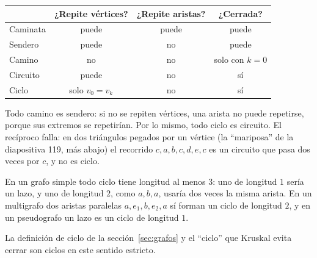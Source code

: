 \documentclass[11pt,letterpaper]{article}
\begin{document}
\begin{center}
\small
\begin{tabular}{lccc}
  \toprule
  & \textbf{¿Repite vértices?} & \textbf{¿Repite aristas?}
    & \textbf{¿Cerrada?} \\
  \midrule
  Caminata & puede & puede & puede \\
  Sendero & puede & no & puede \\
  Camino & no & no & solo con $k = 0$ \\
  Circuito & puede & no & sí \\
  Ciclo & solo $v_0 = v_k$ & no & sí \\
  \bottomrule
\end{tabular}
\end{center}

Todo camino es sendero: si no se repiten vértices, una arista no puede
repetirse, porque sus extremos se repetirían. Por lo mismo, todo ciclo
es circuito. El recíproco falla: en dos triángulos pegados por un
vértice (la ``mariposa'' de la diapositiva 119, más abajo) el
recorrido $c, a, b, c, d, e, c$ es un circuito que pasa dos
veces por $c$, y no es ciclo.

\begin{observacion}
  En un grafo simple todo ciclo tiene longitud al menos $3$: uno de
  longitud $1$ sería un lazo, y uno de longitud $2$, como $a, b, a$,
  usaría dos veces la misma arista. En un multigrafo dos aristas
  paralelas $a, e_1, b, e_2, a$ sí forman un ciclo de longitud $2$, y
  en un pseudografo un lazo es un ciclo de longitud $1$.
\end{observacion}

La definición de ciclo de la sección~\ref{sec:grafos} y el ``ciclo''
que Kruskal evita cerrar son ciclos en este sentido estricto.
\end{document}
